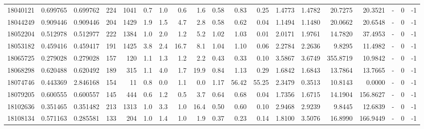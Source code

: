 \begin{tabular}{rrrrrrrrrrrrrrrrlrr}
  18040121 & 0.699765 &   0.699762 &  224 & 1041 &      0.7 &      1.0 &     0.6 &      1.6 &       0.58 &        0.83 &        0.25 &  1.4773 &  1.4782 &   20.7275 &   20.3521 &             - &        0 &         -1 \\
  18044249 & 0.909446 &   0.909446 &  204 & 1429 &      1.9 &      1.5 &     4.7 &      2.8 &       0.58 &        0.62 &        0.04 &  1.1494 &  1.1480 &   20.0662 &   20.6548 &             - &        0 &         -1 \\
  18052204 & 0.512978 &   0.512977 &  222 & 1384 &      1.0 &      2.0 &     1.2 &      5.2 &       1.02 &        1.03 &        0.01 &  2.0171 &  1.9761 &   14.7820 &   37.4953 &             - &        0 &         -1 \\
  18053182 & 0.459416 &   0.459417 &  191 & 1425 &      3.8 &      2.4 &    16.7 &      8.1 &       1.04 &        1.10 &        0.06 &  2.2784 &  2.2636 &    9.8295 &   11.4982 &             - &        0 &         -1 \\
  18065725 & 0.279028 &   0.279028 &  157 &  120 &      1.1 &      1.3 &     1.2 &      2.2 &       0.43 &        0.33 &        0.10 &  3.5867 &  3.6749 &  355.8719 &   10.9842 &             - &        0 &         -1 \\
  18068298 & 0.620488 &   0.620492 &  189 &  315 &      1.1 &      4.0 &     1.7 &     19.9 &       0.84 &        1.13 &        0.29 &  1.6842 &  1.6843 &   13.7864 &   13.7665 &             - &        0 &         -1 \\
  18074746 & 0.443369 &   2.846168 &  154 &   11 &      0.8 &      0.0 &     1.1 &      0.0 &       1.17 &       56.42 &       55.25 &  2.3479 &  0.3513 &   10.8143 &    0.0000 &             - &        0 &         -1 \\
  18079205 & 0.600555 &   0.600557 &  145 &  444 &      0.6 &      1.2 &     0.5 &      3.7 &       0.64 &        0.68 &        0.04 &  1.7356 &  1.6715 &   14.1904 &  156.8627 &             - &        0 &         -1 \\
  18102636 & 0.351465 &   0.351482 &  213 & 1313 &      1.0 &      3.3 &     1.0 &     16.4 &       0.50 &        0.60 &        0.10 &  2.9468 &  2.9239 &    9.8445 &   12.6839 &             - &        0 &         -1 \\
  18108134 & 0.571163 &   0.285581 &  133 &  204 &      1.0 &      1.4 &     1.0 &      1.9 &       0.37 &        0.23 &        0.14 &  1.8100 &  3.5076 &   16.8990 &  166.9449 &             - &        0 &         -1 \\

\end{tabular}

